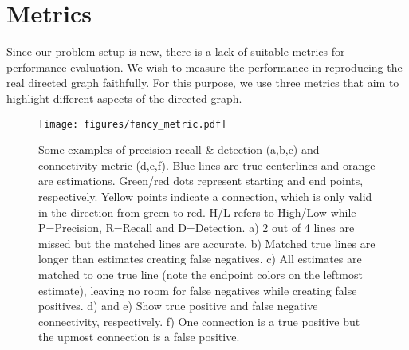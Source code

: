 \documentclass[10pt,twocolumn,letterpaper]{article}
\begin{document}
\section{Metrics}

Since our problem setup is new, there is a lack of suitable metrics for performance evaluation. We wish to measure the performance in reproducing the real directed graph faithfully. For this purpose, we use three metrics that aim to highlight different aspects of the directed graph.

\begin{figure}
    \centering
    \texttt{[image: figures/fancy\_metric.pdf]}
    \vspace{0.2cm}
    \caption{Some examples of precision-recall \& detection (a,b,c) and connectivity metric (d,e,f). Blue lines are true centerlines and orange are estimations. Green/red dots represent starting and end points, respectively. Yellow points indicate a connection, which is only valid in the direction from green to red. H/L refers to High/Low while P=Precision, R=Recall and D=Detection. a) 2 out of 4 lines are missed but the matched lines are accurate. b) Matched true lines are longer than estimates creating false negatives. c) All estimates are matched to one true line (note the endpoint colors on the leftmost estimate), leaving no room for false negatives while creating false positives. d) and e) Show true positive and false negative connectivity, respectively. f) One connection is a true positive but the upmost connection is a false positive.}
    \label{fig:metric_fig}
\end{figure}
\end{document}
